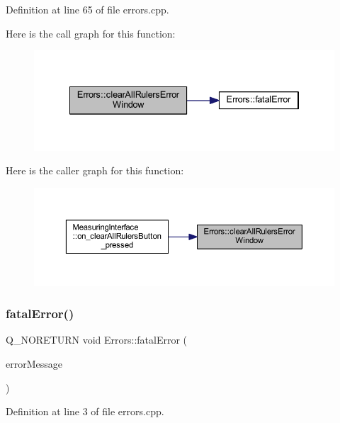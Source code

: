 Definition at line 65 of file errors.\+cpp.

Here is the call graph for this function\+:
\nopagebreak
\begin{figure}[H]
\begin{center}
\leavevmode
\includegraphics[width=334pt]{class_errors_a1aad6f02f491d241fafa37b86dbd0c1a_cgraph}
\end{center}
\end{figure}
Here is the caller graph for this function\+:
\nopagebreak
\begin{figure}[H]
\begin{center}
\leavevmode
\includegraphics[width=350pt]{class_errors_a1aad6f02f491d241fafa37b86dbd0c1a_icgraph}
\end{center}
\end{figure}
\mbox{\label{class_errors_afe4cb66263186b59444271e7ca44e025}} 
\subsubsection{\texorpdfstring{fatalError()}{fatalError()}}
{\footnotesize\ttfamily Q\+\_\+\+N\+O\+R\+E\+T\+U\+RN void Errors\+::fatal\+Error (\begin{DoxyParamCaption}\item[{Q\+String}]{error\+Message }\end{DoxyParamCaption})\hspace{0.3cm}{\ttfamily [static]}}



Definition at line 3 of file errors.\+cpp.

